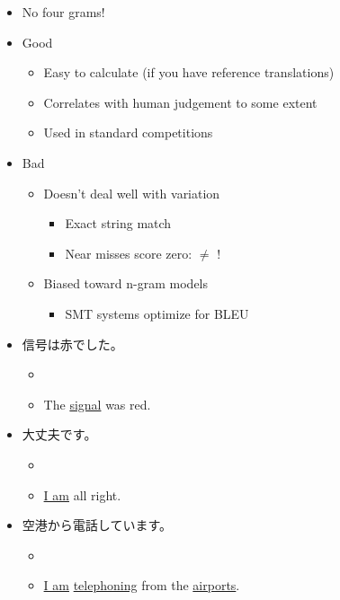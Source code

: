 \documentclass[a4paper,landscape,headrule,footrule,dvips]{foils}
\begin{document}
\begin{CJK}{UTF8}{min}

\begin{itemize}
\item No four grams!
\end{itemize}



  \begin{itemize}
\item Good
  \begin{itemize}
  \item Easy to calculate (if you have reference translations)
  \item Correlates with human judgement to some extent
  \item Used in standard competitions
  \end{itemize}
\item Bad
  \begin{itemize}
  \item Doesn't deal well with variation
    \begin{itemize}
    \item Exact string match
    \item Near misses score zero:  $\ne$ !
    \end{itemize}
  \item Biased toward n-gram models
    \begin{itemize}
    \item SMT systems optimize for BLEU
    \end{itemize}
  \end{itemize}
\end{itemize}




\begin{itemize}
\item 信号は赤でした。
  \begin{itemize}
  \item {}
  \item The \ul{signal} was red. 
  \end{itemize}
\item  大丈夫です。
  \begin{itemize}
  \item {}
  \item \ul{I am} all right. 
  \end{itemize}
\item  空港から電話しています。
  \begin{itemize}
  \item {}
  \item \ul{I am} \ul{telephoning} from the \ul{airports}.
  \end{itemize}
\end{itemize}



\end{CJK}
\end{document}
